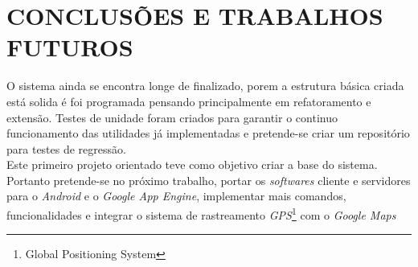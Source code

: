 \chapter{CONCLUSÕES E TRABALHOS FUTUROS}
O sistema ainda se encontra longe de finalizado, porem a estrutura básica criada está solida é foi programada pensando principalmente em refatoramento e extensão.  Testes de unidade foram criados para garantir o continuo funcionamento 
das utilidades já implementadas e pretende-se criar um repositório para testes de regressão.\\

Este primeiro projeto orientado teve como objetivo criar a base do sistema. Portanto pretende-se no próximo trabalho, portar os \emph{softwares} cliente e servidores para o \emph{Android} e o \emph{Google App Engine}, implementar mais comandos, funcionalidades e integrar o sistema de rastreamento \emph{GPS}\footnote{Global Positioning System} com o \emph{Google Maps}
